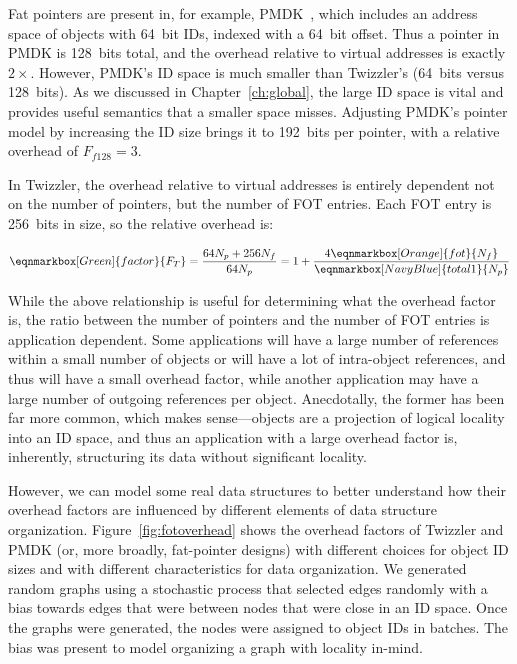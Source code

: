 Fat pointers are present in, for example, PMDK~\cite{pmdk-pointers}, which includes an address space of
objects with 64~bit IDs, indexed with a 64~bit offset. Thus a pointer in PMDK is 128~bits
total, and the overhead relative to virtual addresses is exactly $2\times$. However, PMDK's ID space is much
smaller than Twizzler's (64~bits versus 128~bits). As we discussed in Chapter~\ref{ch:global}, the
large ID space is vital and provides useful semantics that a smaller space misses.
Adjusting PMDK's pointer model by increasing the ID size brings it to 192~bits per pointer, with a
relative overhead of $F_{f128} = 3$.

In Twizzler, the overhead relative to virtual addresses is entirely dependent not on the number of
pointers, but the number of FOT entries. Each FOT entry is 256~bits in size, so the relative
overhead is:

\begin{equation*}
    \eqnmarkbox[Green]{factor}{F_T}
    = \frac{64
        N_p
        + 256
        N_f
    }{64
        N_p
    }
    = 1 + \frac{4
        \eqnmarkbox[Orange]{fot}{N_f}
    }{
        \eqnmarkbox[NavyBlue]{total1}{N_p}
    }
\end{equation*}


While the above relationship is useful for determining what the overhead factor is, the ratio
between the number of pointers and the number of FOT entries is application dependent. Some
applications will have a large number of references within a small number of objects or will have a
lot of intra-object references, and thus will have a small overhead factor, while another
application may have a large number of outgoing references per object. Anecdotally, the former has
been far more common, which makes sense---objects are a projection of logical locality into an ID
space, and thus an application with a large overhead factor is, inherently, structuring its data
without significant locality.

However, we can model some real data structures to better understand how their overhead factors are
influenced by different elements of data structure organization. Figure~\ref{fig:fotoverhead} shows
the overhead factors of Twizzler and PMDK (or, more broadly, fat-pointer designs) with different
choices for object ID sizes and with different characteristics for data organization. We generated
random graphs using a stochastic process that selected edges randomly with a bias towards edges that
were between nodes that were close in an ID space. Once the graphs were generated, the nodes were
assigned to object IDs in batches. The bias was present to model organizing a graph with locality
in-mind.

